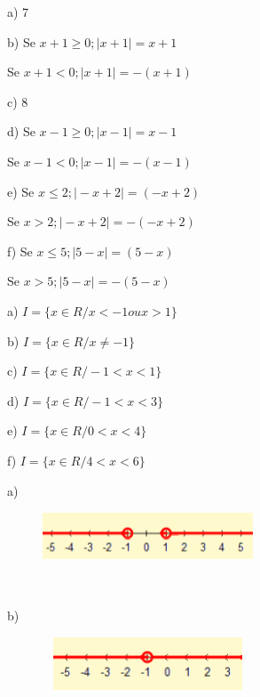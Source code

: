 \begin{respostas}{7}

	\ansitem{} a) 7 

	b) Se  \( x+1 \geq 0; \vert x+1 \vert =x+1 \) 

	Se  \( x+1<0; \vert x+1 \vert =- \left( x+1 \right)  \) 

	c) 8

	d) Se  \( x-1 \geq 0; \vert x-1 \vert =x-1 \) 

	Se  \( x-1<0; \vert x-1 \vert =- \left( x-1 \right)  \) 

	e) Se  \( x \leq 2; \vert -x+2 \vert = \left( -x+2 \right)  \) 

	Se  \( x>2; \vert -x+2 \vert =- \left( -x+2 \right)  \) 

	f) Se  \( x \leq 5; \vert 5-x \vert = \left( 5-x \right)  \) 

	Se  \( x>5; \vert 5-x \vert =- \left( 5-x \right)  \) 

	\ansitem a) \( I= \{ x \in R/x<-1 ou x>1 \}  \) 

	b) \( I= \{ x \in R/x \neq -1 \}  \) 

	c) \( I= \{ x \in R/-1<x<1 \}  \) 

	d) \( I= \{ x \in R /-1<x<3 \}  \) 

	e) \(  I= \{ x \in R /0<x<4 \}  \) 

	f) \( I= \{ x \in R /4<x<6 \}  \) 

	\ansitem{} a) 

	\begin{figure}[H]
		\begin{Center}
			\includegraphics[width=2.47in,height=0.57in]{capitulos/outras_funcoes/media/image80.png}
		\end{Center}
	\end{figure}

~~

	b)

	\begin{figure}[H]
		\begin{Center}
			\includegraphics[width=2.47in,height=0.62in]{capitulos/outras_funcoes/media/image81.png}
		\end{Center}
	\end{figure}


\end{respostas}
